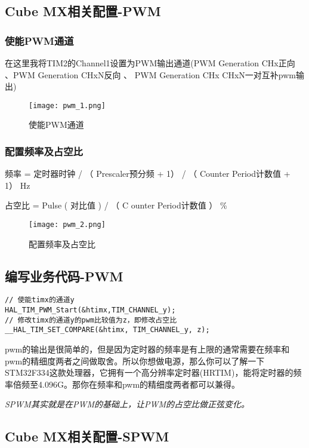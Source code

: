 \documentclass[cn,11pt]{elegantbook}
\begin{document}
\subsection{Cube MX相关配置-PWM}
\subsubsection{使能PWM通道}

在这里我将TIM2的Channel1设置为PWM输出通道(PWM Generation CHx正向 、PWM Generation CHxN反向 、 PWM Generation CHx CHxN一对互补pwm输出)

\begin{figure}[htbp]
	\centering
	\texttt{[image: pwm\_1.png]}
	\caption{使能PWM通道 \label{fig:scatter}}
\end{figure}


\subsubsection{配置频率及占空比}

频率 = 定时器时钟 / （ Prescaler预分频 + 1） /  （   Counter Period计数值 + 1）  Hz

占空比 = Pulse ( 对比值 )  / （ C ounter Period计数值  ） \%


\begin{figure}[htbp]
	\centering
	\texttt{[image: pwm\_2.png]}
	\caption{配置频率及占空比 \label{fig:scatter}}
\end{figure}

\subsection{编写业务代码-PWM}

\lstset{language=C}
\begin{lstlisting}
// 使能timx的通道y
HAL_TIM_PWM_Start(&htimx,TIM_CHANNEL_y); 
// 修改timx的通道y的pwm比较值为z，即修改占空比
__HAL_TIM_SET_COMPARE(&htimx, TIM_CHANNEL_y, z); 
\end{lstlisting}

pwm的输出是很简单的，但是因为定时器的频率是有上限的通常需要在频率和pwm的精细度两者之间做取舍。所以你想做电源，那么你可以了解一下STM32F334这款处理器，它拥有一个高分辨率定时器(HRTIM)，能将定时器的频率倍频至4.096G。那你在频率和pwm的精细度两者都可以兼得。

\emph{SPWM其实就是在PWM的基础上，让PWM的占空比做正弦变化。}

\subsection{Cube MX相关配置-SPWM}
\end{document}
